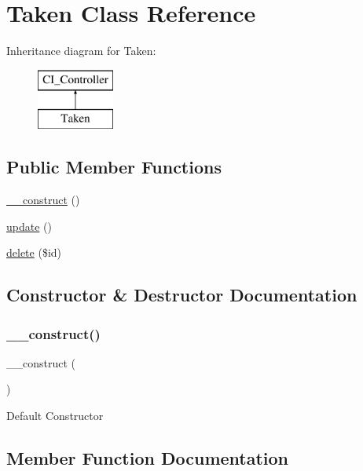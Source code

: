 \hypertarget{class_taken}{}\section{Taken Class Reference}
\label{class_taken}
Inheritance diagram for Taken\+:\begin{figure}[H]
\begin{center}
\leavevmode
\includegraphics[height=2.000000cm]{class_taken}
\end{center}
\end{figure}
\subsection*{Public Member Functions}
\begin{DoxyCompactItemize}
\item 
\mbox{\hyperlink{class_taken_a095c5d389db211932136b53f25f39685}{\+\_\+\+\_\+construct}} ()
\item 
\mbox{\hyperlink{class_taken_a842e4774e3b3601a005b995c02f7e883}{update}} ()
\item 
\mbox{\hyperlink{class_taken_a2f8258add505482d7f00ea26493a5723}{delete}} (\$id)
\end{DoxyCompactItemize}


\subsection{Constructor \& Destructor Documentation}
\mbox{\label{class_taken_a095c5d389db211932136b53f25f39685}} 
\subsubsection{\texorpdfstring{\+\_\+\+\_\+construct()}{\_\_construct()}}
{\footnotesize\ttfamily \+\_\+\+\_\+construct (\begin{DoxyParamCaption}{ }\end{DoxyParamCaption})}

Default Constructor

\subsection{Member Function Documentation}
\mbox{\label{class_taken_a2f8258add505482d7f00ea26493a5723}} 
